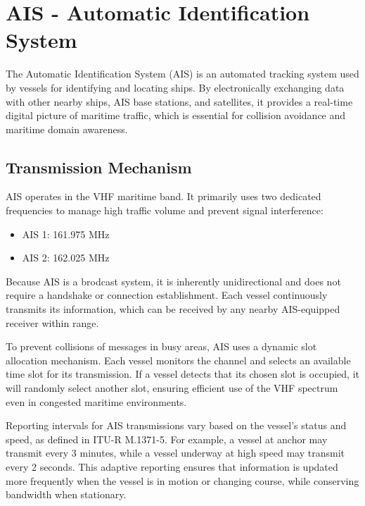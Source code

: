 

\section{AIS - Automatic Identification System}

The Automatic Identification System (AIS) is an automated tracking system used by vessels for identifying and locating ships. By electronically exchanging data with other nearby ships, AIS base stations, and satellites, it provides a real-time digital picture of maritime traffic, which is essential for collision avoidance and maritime domain awareness.

\subsection{Transmission Mechanism}

AIS operates in the VHF maritime band. It primarily uses two dedicated frequencies to manage high traffic volume and prevent signal interference:

\begin{itemize}
    \item AIS 1: 161.975 MHz
    \item AIS 2: 162.025 MHz
\end{itemize}

Because AIS is a brodcast system, it is inherently unidirectional and does not require a handshake or connection establishment. Each vessel continuously transmits its information, which can be received by any nearby AIS-equipped receiver within range.

To prevent collisions of messages in busy areas, AIS uses a dynamic slot allocation mechanism. Each vessel monitors the channel and selects an available time slot for its transmission. If a vessel detects that its chosen slot is occupied, it will randomly select another slot, ensuring efficient use of the VHF spectrum even in congested maritime environments.

Reporting intervals for AIS transmissions vary based on the vessel's status and speed, as defined in ITU-R M.1371-5. For example, a vessel at anchor may transmit every 3 minutes, while a vessel underway at high speed may transmit every 2 seconds. This adaptive reporting ensures that information is updated more frequently when the vessel is in motion or changing course, while conserving bandwidth when stationary.

